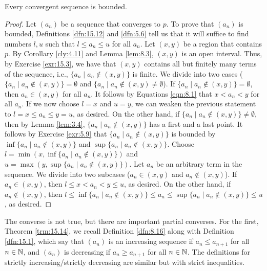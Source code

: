 \documentclass[../main.tex]{subfiles}
\begin{document}
\begin{theorem}\label{trm:15.13}
    Every convergent sequence is bounded.
    \begin{proof}
        Let $(a_n)$ be a sequence that converges to $p$. To prove that $(a_n)$ is bounded, Definitions \ref{dfn:15.12} and \ref{dfn:5.6} tell us that it will suffice to find numbers $l,u$ such that $l\leq a_n\leq u$ for all $a_n$. Let $(x,y)$ be a region that contains $p$. By Corollary \ref{cly:4.11} and Lemma \ref{lem:8.3}, $(x,y)$ is an open interval. Thus, by Exercise \ref{exr:15.3}, we have that $(x,y)$ contains all but finitely many terms of the sequence, i.e., $\{a_n\mid a_n\notin(x,y)\}$ is finite. We divide into two cases ($\{a_n\mid a_n\notin(x,y)\}=\emptyset$ and $\{a_n\mid a_n\notin(x,y)\neq\emptyset$). If $\{a_n\mid a_n\notin(x,y)\}=\emptyset$, then $a_n\in(x,y)$ for all $a_n$. It follows by Equations \ref{eqn:8.1} that $x<a_n<y$ for all $a_n$. If we now choose $l=x$ and $u=y$, we can weaken the previous statement to $l=x\leq a_n\leq y=u$, as desired. On the other hand, if $\{a_n\mid a_n\notin(x,y)\}\neq\emptyset$, then by Lemma \ref{lem:3.4}, $\{a_n\mid a_n\notin(x,y)\}$ has a first and a last point. It follows by Exercise \ref{exr:5.9} that $\{a_n\mid a_n\notin(x,y)\}$ is bounded by $\inf\{a_n\mid a_n\notin(x,y)\}$ and $\sup\{a_n\mid a_n\notin(x,y)\}$. Choose $l=\min(x,\inf\{a_n\mid a_n\notin(x,y)\})$ and $u=\max(y,\sup\{a_n\mid a_n\notin(x,y)\})$. Let $a_n$ be an arbitrary term in the sequence. We divide into two subcases ($a_n\in(x,y)$ and $a_n\notin(x,y)$). If $a_n\in(x,y)$, then $l\leq x<a_n<y\leq u$, as desired. On the other hand, if $a_n\notin(x,y)$, then $l\leq\inf\{a_n\mid a_n\notin(x,y)\}\leq a_n\leq\sup\{a_n\mid a_n\notin(x,y)\}\leq u$, as desired.
    \end{proof}
\end{theorem}

The converse is not true, but there are important partial converses. For the first, Theorem \ref{trm:15.14}, we recall Definition \ref{dfn:8.16} along with Definition \ref{dfn:15.1}, which say that $(a_n)$ is an increasing sequence if $a_n\leq a_{n+1}$ for all $n\in\mathbb{N}$, and $(a_n)$ is decreasing if $a_n\geq a_{n+1}$ for all $n\in\mathbb{N}$. The definitions for strictly increasing/strictly decreasing are similar but with strict inequalities.
\end{document}

